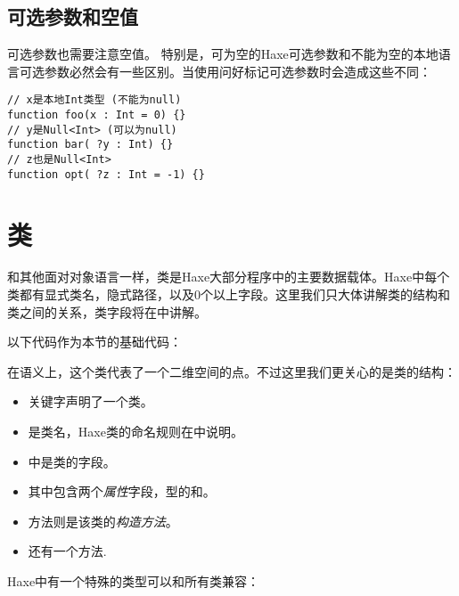 \subsection{可选参数和空值}
\label{types-nullability-optional-arguments}

可选参数也需要注意空值。
特别是，可为空的Haxe可选参数和不能为空的本地语言可选参数必然会有一些区别。当使用问好标记可选参数时会造成这些不同：
\begin{lstlisting}
// x是本地Int类型 (不能为null)
function foo(x : Int = 0) {}
// y是Null<Int> (可以为null)
function bar( ?y : Int) {}
// z也是Null<Int>
function opt( ?z : Int = -1) {}
\end{lstlisting}


\section{类}
\label{types-class-instance}

和其他面对对象语言一样，类是Haxe大部分程序中的主要数据载体。Haxe中每个类都有显式类名，隐式路径，以及0个以上字段。这里我们只大体讲解类的结构和类之间的关系，类字段将在中讲解。

以下代码作为本节的基础代码：


在语义上，这个类代表了一个二维空间的点。不过这里我们更关心的是类的结构：

\begin{itemize}
	\item {}关键字声明了一个类。
	\item {}是类名，Haxe类的命名规则在中说明。
	\item \expr{$\left\{\right\}$}中是类的字段。
	\item 其中包含两个\emph{属性}字段，型的和。
	\item {}方法则是该类的\emph{构造方法}。
	\item 还有一个方法.
\end{itemize}
Haxe中有一个特殊的类型可以和所有类兼容：


